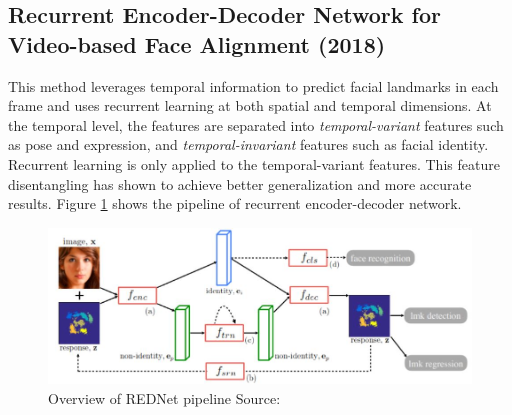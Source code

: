 \documentclass{llncs}
\begin{document}
\subsection{Recurrent Encoder-Decoder Network for Video-based Face Alignment (2018) \cite{rednet}}

This method leverages temporal information to predict facial landmarks in each frame and uses recurrent learning at both spatial and temporal dimensions. At the temporal level, the features are separated into \textit{temporal-variant} features such as pose and expression, and \textit{temporal-invariant} features such as facial identity. Recurrent learning is only applied to the temporal-variant features. This feature disentangling has shown to achieve better generalization and more accurate results. Figure \ref{rednet_architecture} shows the pipeline of recurrent encoder-decoder network. 
\begin{figure}
\centering
\includegraphics[scale=0.5]{Media/rednet_architecture}
\caption{Overview of REDNet pipeline Source:\cite{rednet}}
\label{rednet_architecture}
\end{figure}
\end{document}
